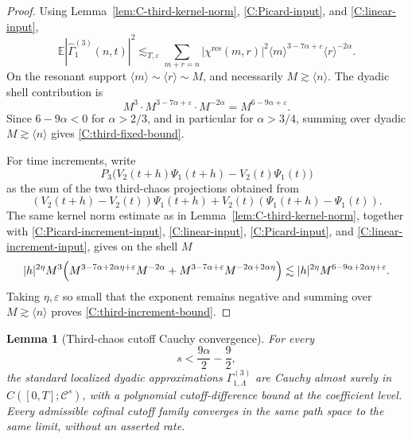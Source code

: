 \documentclass[10pt]{amsart}
\numberwithin{equation}{section}
\theoremstyle{plain}
\newtheorem{lemma}[theorem]{Lemma}
\theoremstyle{definition}
\theoremstyle{remark}
\newcommand{\E}{\mathbb{E}}
\newcommand{\C}{\mathcal{C}}
\newcommand{\eps}{\varepsilon}
\newcommand{\la}{\langle}
\newcommand{\ra}{\rangle}
\newcommand{\wh}{\widehat}
\begin{document}
\begin{proof}
Using Lemma~\ref{lem:C-third-kernel-norm}, \eqref{C:Picard-input}, and \eqref{C:linear-input},
\[
        \E|\wh\Gamma_1^{(3)}(n,t)|^2
        \lesssim_{T,\eps}
        \sum_{m+r=n}|\chi^{\mathrm{res}}(m,r)|^2
        \la m\ra^{3-7\alpha+\eps}\la r\ra^{-2\alpha}.
\]
On the resonant support \(\la m\ra\sim\la r\ra\sim M\), and necessarily \(M\gtrsim\la n\ra\).  The dyadic shell contribution is
\[
        M^3\cdot M^{3-7\alpha+\eps}\cdot M^{-2\alpha}
        =M^{6-9\alpha+\eps}.
\]
Since \(6-9\alpha<0\) for \(\alpha>2/3\), and in particular for \(\alpha>3/4\), summing over dyadic \(M\gtrsim\la n\ra\) gives \eqref{C:third-fixed-bound}.

For time increments, write
\[
        P_3\bigl(V_2(t+h)\Psi_1(t+h)-V_2(t)\Psi_1(t)\bigr)
\]
as the sum of the two third-chaos projections obtained from
\[
        (V_2(t+h)-V_2(t))\Psi_1(t+h)
        +V_2(t)(\Psi_1(t+h)-\Psi_1(t)).
\]
The same kernel norm estimate as in Lemma~\ref{lem:C-third-kernel-norm}, together with \eqref{C:Picard-increment-input}, \eqref{C:linear-input}, \eqref{C:Picard-input}, and \eqref{C:linear-increment-input}, gives on the shell \(M\)
\[
        |h|^{2\eta}
        M^3\Bigl(M^{3-7\alpha+2\alpha\eta+\eps}M^{-2\alpha}
        +M^{3-7\alpha+\eps}M^{-2\alpha+2\alpha\eta}\Bigr)
        \lesssim
        |h|^{2\eta}M^{6-9\alpha+2\alpha\eta+\eps}.
\]
Taking \(\eta,\eps\) so small that the exponent remains negative and summing over \(M\gtrsim\la n\ra\) proves \eqref{C:third-increment-bound}.
\end{proof}

\begin{lemma}[Third-chaos cutoff Cauchy convergence]\label{lem:C-third-tail}
For every
\[
        s<\frac{9\alpha}{2}-\frac92,
\]
the standard localized dyadic approximations \(\Gamma_{1,\Lambda}^{(3)}\) are Cauchy almost surely in \(C([0,T];\C^s)\), with a polynomial cutoff-difference bound at the coefficient level.  Every admissible cofinal cutoff family converges in the same path space to the same limit, without an asserted rate.
\end{lemma}
\end{document}
